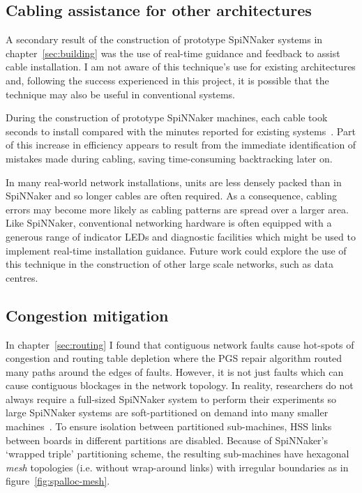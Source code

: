 		\subsection{Cabling assistance for other architectures}
			
			A secondary result of the construction of prototype SpiNNaker systems in
			chapter~\ref{sec:building} was the use of real-time guidance and feedback
			to assist cable installation. I am not aware of this technique's use for
			existing architectures and, following the success experienced in this
			project, it is possible that the technique may also be useful in
			conventional systems.
			
			During the construction of prototype SpiNNaker machines, each cable took
			seconds to install compared with the minutes reported for existing
			systems~\cite{mudigonda11}. Part of this increase in efficiency appears
			to result from the immediate identification of mistakes made during
			cabling, saving time-consuming backtracking later on.
			
			In many real-world network installations, units are less densely packed
			than in SpiNNaker and so longer cables are often required. As a
			consequence, cabling errors may become more likely as cabling patterns
			are spread over a larger area. Like SpiNNaker, conventional networking
			hardware is often equipped with a generous range of indicator LEDs and
			diagnostic facilities which might be used to implement real-time
			installation guidance. Future work could explore the use of this
			technique in the construction of other large scale networks, such as data
			centres.
		
		\subsection{Congestion mitigation}
			
			\label{sec:wiggly-board-allocations}
			
			In chapter~\ref{sec:routing} I found that contiguous network faults cause
			hot-spots of congestion and routing table depletion where the PGS repair
			algorithm routed many paths around the edges of faults.  However, it is
			not just faults which can cause contiguous blockages in the network
			topology. In reality, researchers do not always require a full-sized
			SpiNNaker system to perform their experiments so large SpiNNaker systems
			are soft-partitioned on demand into many smaller
			machines~\cite{spalloc16}. To ensure isolation between partitioned
			sub-machines, HSS links between boards in different partitions are
			disabled. Because of SpiNNaker's `wrapped triple' partitioning scheme,
			the resulting sub-machines have hexagonal \emph{mesh} topologies (i.e.
			without wrap-around links) with irregular boundaries as in
			figure~\ref{fig:spalloc-mesh}.
			
